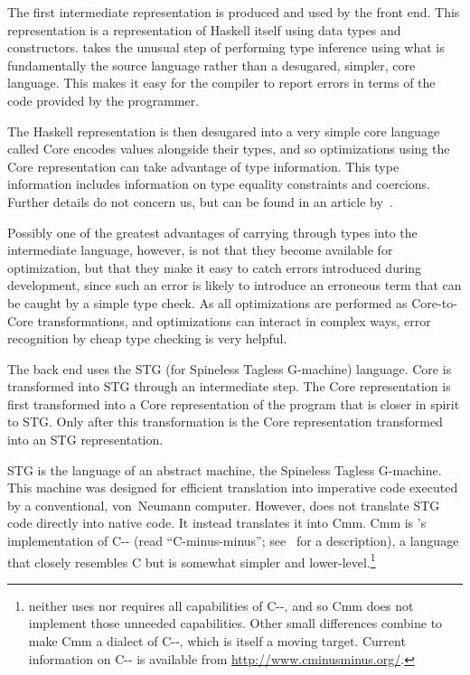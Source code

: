 The first intermediate representation is produced and used by the front end. This representation is a representation of Haskell itself using data types and constructors. \GHC takes the unusual step of performing type inference using what is fundamentally the source language rather than a desugared, simpler, core language. This makes it easy for the compiler to report errors in terms of the code provided by the programmer.

The Haskell representation is then desugared into a very simple core language called  Core encodes values alongside their types, and so optimizations using the Core representation can take advantage of type information. This type information includes information on type equality constraints and coercions. Further details do not concern us, but can be found in an article by~\citet{Sulzmann:System:2007}.

Possibly one of the greatest advantages of carrying through types into the intermediate language, however, is not that they become available for optimization, but that they make it easy to catch errors introduced during development, since such an error is likely to introduce an erroneous term that can be caught by a simple type check. As all optimizations are performed as Core-to-Core transformations, and optimizations can interact in complex ways, error recognition by cheap type checking is very helpful.

The back end uses the STG (for Spineless Tagless G-machine) language. Core is transformed into STG through an intermediate step. The Core representation is first transformed into a Core representation of the program that is closer in spirit to STG. Only after this transformation is the Core representation transformed into an STG representation.

STG is the language of an abstract machine, the Spineless Tagless G-machine. This machine was designed for efficient translation into imperative code executed by a conventional, von~Neumann computer. However, \GHC does not translate STG code directly into native code. It instead translates it into Cmm. Cmm is \GHC{}'s implementation of C-{}- (read ``C-minus-minus''; see~\citet{Peyton-Jones:C--:1999} for a description), a language that closely resembles C but is somewhat simpler and lower-level.\footnote{\GHC neither uses nor requires all capabilities of C-{}-, and so Cmm does not implement those unneeded capabilities. Other small differences combine to make Cmm a dialect of C-{}-, which is itself a moving target. Current information on C-{}- is available from \url{http://www.cminusminus.org/}.}

